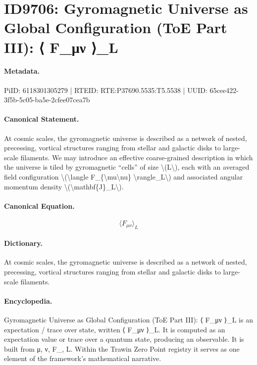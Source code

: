 \section*{ID9706: Gyromagnetic Universe as Global Configuration (ToE Part III): ⟨ F\_μν ⟩\_L}
\paragraph{Metadata.}
PiID: 6118301305279 | RTEID: RTE:P37690.5535:T5.5538 | UUID: 65cee422-3f5b-5c05-ba5e-2cfee07cea7b

\paragraph{Canonical Statement.}
At cosmic scales, the gyromagnetic universe is described as a network of nested, precessing, vortical structures ranging from stellar and galactic disks to large-scale filaments. We may introduce an effective coarse-grained description in which the universe is tiled by gyromagnetic ``cells'' of size \textbackslash{}(L\textbackslash{}), each with an averaged field configuration \textbackslash{}(\textbackslash{}langle F\_\{\textbackslash{}mu\textbackslash{}nu\} \textbackslash{}rangle\_L\textbackslash{}) and associated angular momentum density \textbackslash{}(\textbackslash{}mathbf\{J\}\_L\textbackslash{}).

\paragraph{Canonical Equation.}
\[
\langle F_{\mu\nu} \rangle_L
\]

\paragraph{Dictionary.}
At cosmic scales, the gyromagnetic universe is described as a network of nested, precessing, vortical structures ranging from stellar and galactic disks to large-scale filaments.

\paragraph{Encyclopedia.}
Gyromagnetic Universe as Global Configuration (ToE Part III): ⟨ F\_μν ⟩\_L is an expectation / trace over state, written ⟨ F\_μν ⟩\_L. It is computed as an expectation value or trace over a quantum state, producing an observable. It is built from μ, ν, F\_, L. Within the Trawin Zero Point registry it serves as one element of the framework's mathematical narrative.
